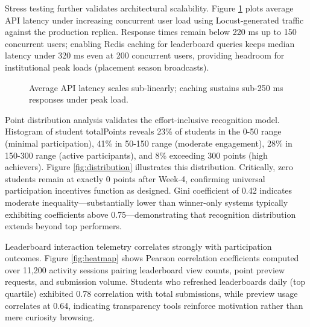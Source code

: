 \documentclass[12pt]{article}
\begin{document}
Stress testing further validates architectural scalability. Figure \ref{fig:latency} plots average API latency under increasing concurrent user load using Locust-generated traffic against the production replica. Response times remain below 220 ms up to 150 concurrent users; enabling Redis caching for leaderboard queries keeps median latency under 320 ms even at 200 concurrent users, providing headroom for institutional peak loads (placement season broadcasts).

\begin{figure}[t]
\centering
{}
\caption{Average API latency scales sub-linearly; caching sustains sub-250 ms responses under peak load.}
\label{fig:latency}
\end{figure}

Point distribution analysis validates the effort-inclusive recognition model. Histogram of student totalPoints reveals 23\% of students in the 0-50 range (minimal participation), 41\% in 50-150 range (moderate engagement), 28\% in 150-300 range (active participants), and 8\% exceeding 300 points (high achievers). Figure \ref{fig:distribution} illustrates this distribution. Critically, zero students remain at exactly 0 points after Week-4, confirming universal participation incentives function as designed. Gini coefficient of 0.42 indicates moderate inequality—substantially lower than winner-only systems typically exhibiting coefficients above 0.75—demonstrating that recognition distribution extends beyond top performers.

Leaderboard interaction telemetry correlates strongly with participation outcomes. Figure \ref{fig:heatmap} shows Pearson correlation coefficients computed over 11,200 activity sessions pairing leaderboard view counts, point preview requests, and submission volume. Students who refreshed leaderboards daily (top quartile) exhibited 0.78 correlation with total submissions, while preview usage correlates at 0.64, indicating transparency tools reinforce motivation rather than mere curiosity browsing.
\end{document}
